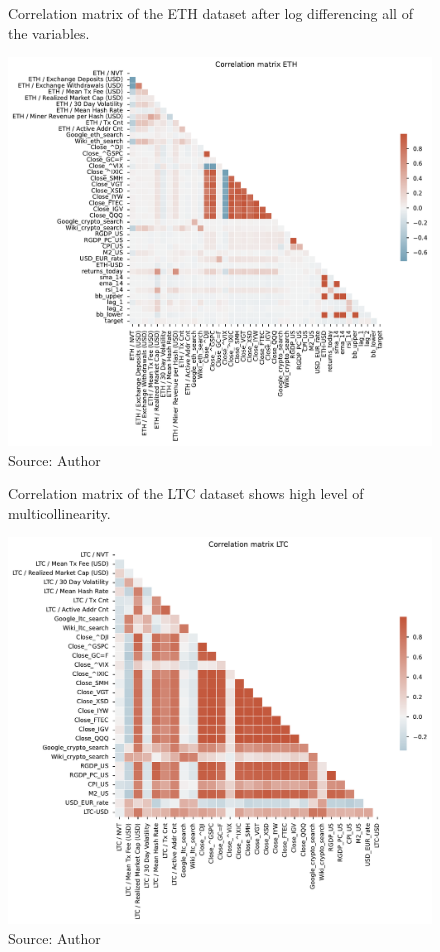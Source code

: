 \begin{figure}[!h]
    \centering
    \caption{Correlation matrix of the ETH dataset after
    log differencing all of the variables.}
    \includegraphics[width=1\textwidth]{Figures/Corr_eth_logdiff.pdf}
    \caption*{Source: Author}
    \label{fig:Corr_eth_logdiff}
\end{figure}

\begin{figure}[!h]
    \centering
    \caption{Correlation matrix of the LTC dataset shows high level of 
    multicollinearity.}
    \includegraphics[width=1\textwidth]{Figures/Corr_ltc.pdf}
    \caption*{Source: Author}
    \label{fig:Corr_ltc}
\end{figure}


